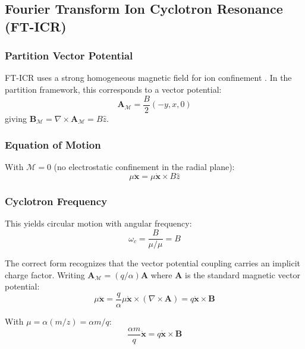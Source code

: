 \documentclass[twocolumn,10pt,a4paper]{article}
\theoremstyle{definition}
\theoremstyle{remark}
\newcommand{\Mdepth}{\mathcal{M}}
\newcommand{\Apartition}{\mathbf{A}_{\mathcal{M}}}
\newcommand{\partinert}{\mu}
\begin{document}
\subsection{Fourier Transform Ion Cyclotron Resonance (FT-ICR)}

\subsubsection{Partition Vector Potential}

FT-ICR uses a strong homogeneous magnetic field for ion confinement \citep{marshall1998}. In the partition framework, this corresponds to a vector potential:
\begin{equation}
    \Apartition = \frac{B}{2}(-y, x, 0)
    \label{eq:icr_vector}
\end{equation}
giving $\mathbf{B}_{\Mdepth} = \nabla \times \Apartition = B\hat{z}$.

\subsubsection{Equation of Motion}

With $\Mdepth = 0$ (no electrostatic confinement in the radial plane):
\begin{equation}
    \partinert\ddot{\mathbf{x}} = \partinert\dot{\mathbf{x}} \times B\hat{z}
    \label{eq:icr_eom}
\end{equation}

\subsubsection{Cyclotron Frequency}

This yields circular motion with angular frequency:
\begin{equation}
    \omega_c = \frac{B}{\partinert/\partinert} = B
    \label{eq:cyclotron_wrong}
\end{equation}

The correct form recognizes that the vector potential coupling carries an implicit charge factor. Writing $\Apartition = (q/\alpha)\mathbf{A}$ where $\mathbf{A}$ is the standard magnetic vector potential:
\begin{equation}
    \partinert\ddot{\mathbf{x}} = \frac{q}{\alpha}\partinert\dot{\mathbf{x}} \times (\nabla \times \mathbf{A}) = q\dot{\mathbf{x}} \times \mathbf{B}
\end{equation}

With $\partinert = \alpha(m/z) = \alpha m/q$:
\begin{equation}
    \frac{\alpha m}{q}\ddot{\mathbf{x}} = q\dot{\mathbf{x}} \times \mathbf{B}
\end{equation}
\end{document}
